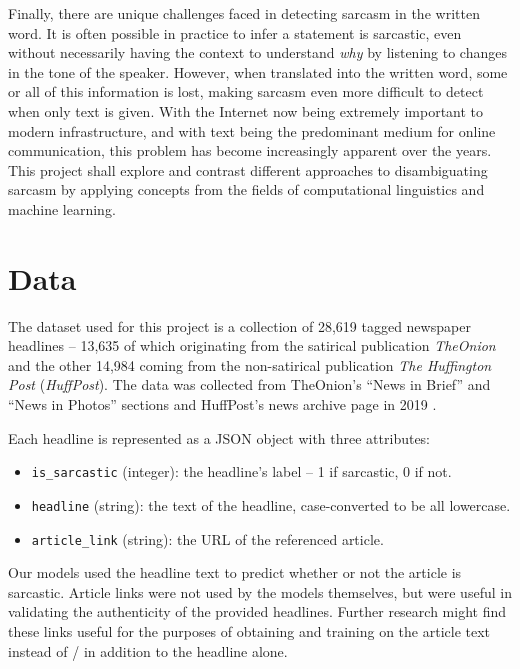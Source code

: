 \documentclass[11pt]{article}
\begin{document}
Finally, there are unique challenges faced in detecting sarcasm in the written
word. It is often possible in practice to infer a statement is sarcastic, even
without necessarily having the context to understand \textit{why} by listening
to changes in the tone of the speaker. However, when translated into the
written word, some or all of this information is lost, making sarcasm even more
difficult to detect when only text is given. With the Internet now being
extremely important to modern infrastructure, and with text being the
predominant medium for online communication, this problem has become
increasingly apparent over the years. This project shall explore and contrast
different approaches to disambiguating sarcasm by applying concepts from the
fields of computational linguistics and machine learning.


\section{Data}\label{sec:data}

The dataset used for this project is a collection of 28,619 tagged newspaper
headlines -- 13,635 of which originating from the satirical publication
\textit{TheOnion} and the other 14,984 coming from the non-satirical
publication \textit{The Huffington Post} (\textit{HuffPost}). The data was
collected from TheOnion's ``News in Brief'' and ``News in Photos'' sections and
HuffPost's news archive page in 2019 \cite{misra2023Sarcasm}.

Each headline is represented as a JSON object with three attributes:
\begin{itemize}
    \item \texttt{is\_sarcastic} (integer): the headline's label -- 1 if
          sarcastic, 0 if not.
    \item \texttt{headline} (string): the text of the headline, case-converted
          to be all lowercase.
    \item \texttt{article\_link} (string): the URL of the referenced article.
\end{itemize}

Our models used the headline text to predict whether or not the article is
sarcastic. Article links were not used by the models themselves, but were
useful in validating the authenticity of the provided headlines. Further
research might find these links useful for the purposes of obtaining and
training on the article text instead of / in addition to the headline alone.
\end{document}
